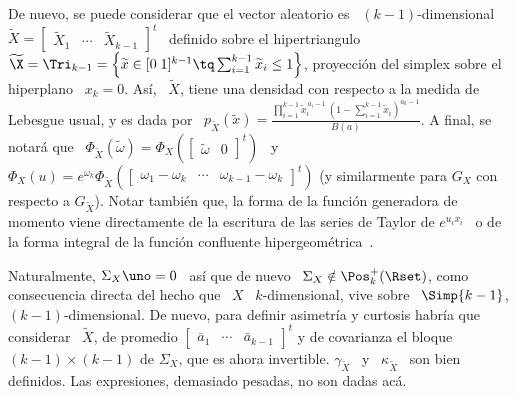 
De nuevo, se puede considerar que el vector aleatorio es \ $(k-1)$-dimensional \
$\widetilde{X}     =    \begin{bmatrix}     \widetilde{X}_1    &     \cdots    &
  \widetilde{X}_{k-1}  \end{bmatrix}^t$  \ definido  sobre  el hipertriangulo  \
$\widetilde{\X}  = \Tri_{k-1}  = \left\{  \widetilde{x} \in  [0 \;  1]^{k-1} \tq
  \sum_{i=1}^{k-1}  \widetilde{x}_i \le  1 \right\}$,  proyecci\'on  del simplex
sobre el  hiperplano \ $x_k =  0$. As\'i, \ $\widetilde{X}$,  tiene una densidad
con   respecto   a   la  medida   de   Lebesgue   usual,   y   es  dada   por   \
$p_{\widetilde{X}}\left(   \widetilde{x}   \right)   =   \frac{\prod_{i=1}^{k-1}
  \widetilde{x}_i^{\,  a_i-1}  \, \left(  1  - \sum_{i=1}^{k-1}  \widetilde{x}_i
  \right)^{a_k-1}}{B(a)}$.      A      final,     se     notar\'a      que     \
$\Phi_{\widetilde{X}}\left(         \widetilde{\omega}         \right)         =
\Phi_X\left( \begin{bmatrix} \widetilde{\omega} & 0 \end{bmatrix}^t \right)$ \ y
\ $\Phi_X(u) =  e^{\omega_k} \Phi_{\widetilde{X}}\left( \begin{bmatrix} \omega_1
    - \omega_k  & \cdots &  \omega_{k-1} - \omega_k \end{bmatrix}^t  \right)$ (y
similarmente  para $G_X$  con respecto  a $G_{\widetilde{X}}$).   Notar tambi\'en
que, la  forma de la  funci\'on generadora de  momento viene directamente  de la
escritura de las series  de Taylor de $e^{u_i x_i}$ \ o  de la forma integral de
la funci\'on confluente hipergeom\'etrica~\cite{Phi88}.

Naturalmente,  $\Sigma_X \uno  = 0$  \  as\'i que  de nuevo  \ $\Sigma_X  \notin
\Pos_k^+(\Rset)$, como consecuencia directa del  hecho que \ $X$ \ $k$-dimensional,
vive  sobre   \  $\Simp{k-1}$,  $(k-1)$-dimensional.  De   nuevo,  para  definir
asimetr\'ia y  curtosis habr\'ia que  considerar \ $\widetilde{X}$,  de promedio
$\begin{bmatrix}  \bar{a}_1  &  \cdots  & \bar{a}_{k-1}  \end{bmatrix}^t$  y  de
covarianza  el  bloque  $(k-1)  \times   (k-1)$  de  $\Sigma_X$,  que  es  ahora
invertible. $\gamma_{\widetilde{X}}$  \ y \ $\kappa_{\widetilde{X}}$  \ son bien
definidos. Las expresiones, demasiado pesadas, no son dadas ac\'a.

